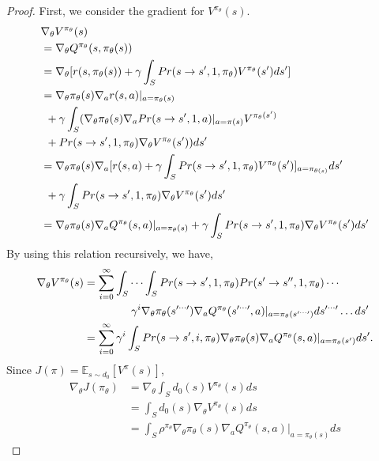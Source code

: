 \documentclass[english, dvipdfmx]{ampmt}             %
\newcommand{\expect}{\mathbb{E}}
\begin{document}
\begin{proof}
First, we consider the gradient for $V^{\pi_{\theta}}(s)$.
\begin{align}
	& \nabla_{\theta}V^{\pi_{\theta}}(s) \nonumber \\ 
	&= \nabla_{\theta}Q^{\pi_{\theta}}(s, \pi_{\theta}(s))\nonumber\\
	&= \nabla_{\theta}[r(s,\pi_{\theta}(s))+\gamma\int_{S}Pr(s\to s^{\prime}, 1, \pi_{\theta})V^{\pi_{\theta}}(s^{\prime})ds^{\prime}] \nonumber\\
	&= \nabla_{\theta}\pi_{\theta}(s)\nabla_{a}r(s,a)|_{a=\pi_{\theta}(s)} \nonumber \\
	&\hspace{1ex}+\gamma\int_{S}(\nabla_{\theta}\pi_{\theta}(s)\nabla_aPr(s\to s^{\prime},1,a)|_{a=\pi(s)}V^{\pi_{\theta}(s^{\prime})}\nonumber\\
	&\hspace{1ex}+Pr(s\to s^{\prime}, 1, \pi_{\theta})\nabla_{\theta}V^{\pi_{\theta}}(s^{\prime}))ds^{\prime}\nonumber\\
	&= \nabla_{\theta}\pi_{\theta}(s)\nabla_a[r(s,a)+\gamma\int_{S}Pr(s\to s^{\prime}, 1, \pi_{\theta})V^{\pi_{\theta}}(s^{\prime})]_{a=\pi_{\theta(s)}}ds^{\prime} \nonumber \\
	&\hspace{1ex}+\gamma\int_{S}Pr(s\to s^{\prime}, 1, \pi_{\theta})\nabla_{\theta}V^{\pi_{\theta}}(s^{\prime})ds^{\prime}\nonumber\\
	&= \nabla_{\theta}\pi_{\theta}(s)\nabla_aQ^{\pi_{\theta}}(s,a)|_{a=\pi_{\theta}(s)} + \gamma\int_{S}Pr(s\to s^{\prime}, 1, \pi_{\theta})\nabla_{\theta}V^{\pi_{\theta}}(s^{\prime})ds^{\prime}
\end{align}
By using this relation recursively, we have,
\begin{align}
	\nabla_{\theta}V^{\pi_{\theta}}(s) &= \sum_{i=0}^{\infty}\int_{S}\cdots\int_{S}Pr(s\to s^{\prime},1,\pi_{\theta})Pr(s^{\prime}\to s^{\prime\prime},1,\pi_{\theta})\cdots\nonumber\\
	&\hspace{10ex}\gamma^i\nabla_{\theta}\pi_{\theta}(s^{\prime\cdots\prime})\nabla_aQ^{\pi_{\theta}}(s^{\prime\cdots\prime},a)|_{a=\pi_{\theta}(s^{\prime\cdots\prime})}ds^{\prime\cdots\prime}\ldots ds^{\prime}\nonumber\\
	&= \sum_{i=0}^{\infty} \gamma^i\int_{S}Pr(s\to s^{\prime}, i, \pi_{\theta})\nabla_{\theta}\pi_{\theta}(s)\nabla_aQ^{\pi_{\theta}}(s,a)|_{a=\pi_{\theta}(s^{\prime})}ds^{\prime}.\label{multiple_integral}
\end{align}
Since $J(\pi) = \expect_{s\sim d_0}[V^{\pi}(s)]$, 
\begin{align}
	\nabla_{\theta}J(\pi_{\theta}) &= \nabla_{\theta}\int_{S}d_0(s)V^{\pi_{\theta}}(s)ds \nonumber\\
	&= \int_{S}d_0(s)\nabla_{\theta}V^{\pi_{\theta}}(s)ds \nonumber\\
	&= \int_{S}\rho^{\pi_{\theta}}\nabla_{\theta}\pi_{\theta}(s)\nabla_aQ^{\pi_{\theta}}(s,a)|_{a=\pi_{\theta}(s)}ds
\end{align}
\end{proof}
\end{document}
